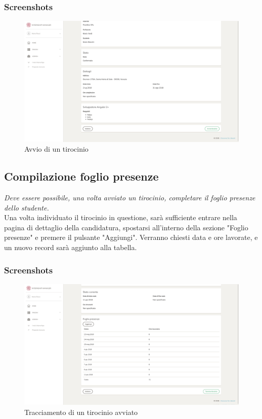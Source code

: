 \subsubsection{Screenshots}
\begin{figure}[H]
	\centering
	\includegraphics[width=1\textwidth]{Chapter3/Figs/screenshots/internshipproposalstart}     
	\caption[Screenshot: avvio di un tirocinio]{Avvio di un tirocinio}
	\label{fig:screenshot:7}
\end{figure}

\pagebreak
\subsection{Compilazione foglio presenze}\label{sec:compilazione-foglio-presenze}

\textit{Deve essere possibile, una volta avviato un tirocinio, completare il foglio presenze dello studente.} \\

\noindent
Una volta individuato il tirocinio in questione, sarà sufficiente entrare nella pagina di dettaglio della candidatura, spostarsi all'interno della sezione "Foglio presenze" e premere il pulsante "Aggiungi". Verranno chiesti data e ore lavorate, e un nuovo record sarà aggiunto alla tabella.

\subsubsection{Screenshots}
\begin{figure}[H]
	\centering
	\includegraphics[width=1\textwidth]{Chapter3/Figs/screenshots/internshiptrack}     
	\caption[Screenshot: tracciamento di un tirocinio avviato]{Tracciamento di un tirocinio avviato}
	\label{fig:screenshot:8}
\end{figure}

